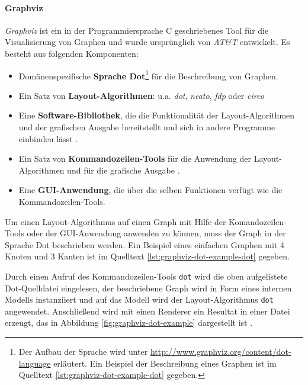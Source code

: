 \paragraph{Graphviz}

\textit{Graphviz} ist ein in der Programmiersprache C geschriebenes Tool für die Visualisierung von Graphen und wurde ursprünglich von \textit{AT\&T} entwickelt. Es besteht aus folgenden Komponenten:

\begin{itemize}
    \item Domänenspezifische \textbf{Sprache Dot}\footnote{Der Aufbau der Sprache wird unter \url{http://www.graphviz.org/content/dot-language} erläutert. Ein Beispiel der Beschreibung eines Graphen ist im Quelltext \ref{lst:graphviz-dot-example-dot} gegeben.} für die Beschreibung von Graphen.
    \item Ein Satz von \textbf{Layout-Algorithmen}: u.a. \textit{dot}, \textit{neato}, \textit{fdp} oder \textit{circo} \cite{Gansner14Using, NorthGansner14Dot-Manual}
    \item Eine \textbf{Software-Bibliothek}, die die Funktionalität der Layout-Algorithmen und der grafischen Ausgabe bereitstellt und sich in andere Programme einbinden lässt \cite{Gansner14Using}.
    \item Ein Satz von \textbf{Kommandozeilen-Tools} für die Anwendung der Layout-Algorithmen und für die grafische Ausgabe \cite{NorthGansner14Dot-Manual}.
    \item Eine \textbf{GUI-Anwendung}, die über die selben Funktionen verfügt wie die Kommandozeilen-Tools.
\end{itemize}


Um einen Layout-Algorithmus auf einen Graph mit Hilfe der Komandozeilen-Tools oder der GUI-Anwendung anwenden zu können, muss der Graph in der Sprache Dot beschrieben werden. Ein Beispiel eines einfachen Graphen mit 4 Knoten und 3 Kanten ist im Quelltext \ref{lst:graphviz-dot-example-dot} gegeben.



Durch einen Aufruf des Kommandozeilen-Tools \texttt{dot} wird die oben aufgelistete Dot-Quelldatei eingelesen, der beschriebene Graph wird in Form eines internen Modells instanziiert und auf das Modell wird der Layout-Algorithmus \texttt{dot} angewendet. Anschließend wird mit einen Renderer ein Resultat in einer Datei erzeugt, das in Abbildung \ref{fig:graphviz-dot-example} dargestellt ist \cite{Gansner14Using}.

